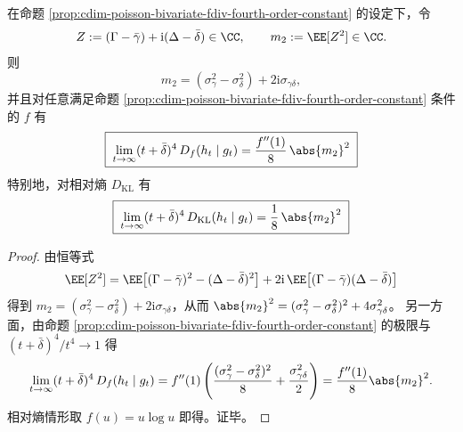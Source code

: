 \begin{corollary}\label{cor:cdim-poisson-bivariate-fdiv-fourth-order-complex-m2}
在命题 \ref{prop:cdim-poisson-bivariate-fdiv-fourth-order-constant} 的设定下，令
\[
Z:=(\Gamma-\bar\gamma)+\mathrm{i}(\Delta-\bar\delta)\in\CC,
\qquad
m_2:=\EE[Z^2]\in\CC.
\]
则
\[
\boxed{\;
m_2=(\sigma_\gamma^2-\sigma_\delta^2)+2\mathrm{i}\sigma_{\gamma\delta},\;}
\]
并且对任意满足命题 \ref{prop:cdim-poisson-bivariate-fdiv-fourth-order-constant} 条件的 \(f\) 有
\[
\boxed{\;
\lim_{t\to\infty}(t+\bar\delta)^4\,D_f(h_t\mid g_t)
=\frac{f''(1)}{8}\,\abs{m_2}^2\;}
\]
特别地，对相对熵 \(D_{\mathrm{KL}}\) 有
\[
\boxed{\;
\lim_{t\to\infty}(t+\bar\delta)^4\,D_{\mathrm{KL}}(h_t\mid g_t)
=\frac{1}{8}\,\abs{m_2}^2\;}
\]
\end{corollary}
\begin{proof}
由恒等式
\[
\EE[Z^2]
=\EE\bigl[(\Gamma-\bar\gamma)^2-(\Delta-\bar\delta)^2\bigr]
  +2\mathrm{i}\,\EE\bigl[(\Gamma-\bar\gamma)(\Delta-\bar\delta)\bigr]
\]
得到 \(m_2=(\sigma_\gamma^2-\sigma_\delta^2)+2\mathrm{i}\sigma_{\gamma\delta}\)，从而
\(
\abs{m_2}^2=(\sigma_\gamma^2-\sigma_\delta^2)^2+4\sigma_{\gamma\delta}^2
\)。
另一方面，由命题 \ref{prop:cdim-poisson-bivariate-fdiv-fourth-order-constant} 的极限与 \((t+\bar\delta)^4/t^4\to 1\) 得
\[
\lim_{t\to\infty}(t+\bar\delta)^4\,D_f(h_t\mid g_t)
=f''(1)\left(\frac{(\sigma_\gamma^2-\sigma_\delta^2)^2}{8}+\frac{\sigma_{\gamma\delta}^2}{2}\right)
=\frac{f''(1)}{8}\abs{m_2}^2.
\]
相对熵情形取 \(f(u)=u\log u\) 即得。证毕。
\end{proof}

